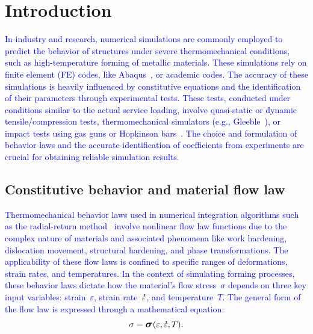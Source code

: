 \documentclass[algorithms,article,submit,pdftex,oneauthors]{Definitions/mdpi}
\DeclareRobustCommand{\mdot}[1]{\accentset{\mbox{\bfseries .}}{#1}}
\DeclareRobustCommand{\Sig}{\mbox{\large\ensuremath{\boldsymbol{\sigma}}}}
\begin{document}
\section{Introduction}\label{sec:Introduction}

\textcolor{blue}{In industry and research, numerical simulations are commonly employed to predict the behavior of structures under severe thermomechanical conditions, such as high-temperature forming of metallic materials.
These simulations rely on finite element (FE) codes, like Abaqus~\cite{Abaqus}, or academic codes.
The accuracy of these simulations is heavily influenced by constitutive equations and the identification of their parameters through experimental tests.
These tests, conducted under conditions similar to the actual service loading, involve quasi-static or dynamic tensile/compression tests, thermomechanical simulators (e.g., Gleeble~\cite{Lin-2009-MFS, Bennett-2010-C, Kumar-2016-TMS, Yu-2019-RCR}), or impact tests using gas guns or Hopkinson bars~\cite{Kolsky-1949-IMP}.
The choice and formulation of behavior laws and the accurate identification of coefficients from experiments are crucial for obtaining reliable simulation results.}

\subsection{Constitutive behavior and material flow law}\label{subsec:ConstBehavior}

\textcolor{blue}{Thermomechanical behavior laws used in numerical integration algorithms such as the radial-return method~\cite{Ponthot-2002-USU} involve nonlinear flow law functions due to the complex nature of materials and associated phenomena like work hardening, dislocation movement, structural hardening, and phase transformations.
The applicability of these flow laws is confined to specific ranges of deformations, strain rates, and temperatures.
In the context of simulating forming processes, these behavior laws dictate how the material's flow stress~$\sigma$ depends on three key input variables: strain~$\varepsilon$, strain rate~$\mdot{\varepsilon}$, and temperature~$T$.
The general form of the flow law is expressed through a mathematical equation:}
\begin{equation}
\sigma = \Sig\left(\varepsilon, \mdot{\varepsilon}, T\right).\label{eq:GenFlow}
\end{equation}
\end{document}
